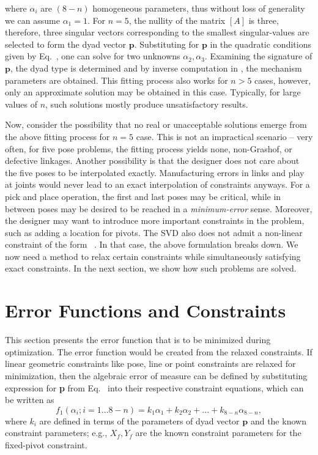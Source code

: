 where $\alpha_i$ are $(8-n)$ homogeneous parameters, thus without loss of generality we can assume $\alpha_{1} = 1$. For $n=5$, the nullity of the matrix $[A]$ is three, therefore, three singular vectors corresponding to the smallest singular-values are selected to form the dyad vector $\textbf{p}$. Substituting for $\textbf{p}$ in the quadratic conditions given by Eq.~, one can solve for two unknowns $\alpha_2, \alpha_3$. Examining the signature of $\textbf{p}$, the dyad type is determined and by inverse computation in , the mechanism parameters are obtained. This fitting process also works for $n>5$ cases, however, only an approximate solution may be obtained in this case. Typically, for large values of $n$, such solutions mostly produce unsatisfactory results.

Now, consider the possibility that no real or unacceptable solutions emerge from the above fitting process for $n=5$ case. This is not an impractical scenario -- very often, for five pose problems, the fitting process yields none, non-Grashof, or defective linkages. Another possibility is that the designer does not care about the five poses to be interpolated exactly. Manufacturing errors in links and play at joints would never lead to an exact interpolation of constraints anyways. For a pick and place operation, the first and last poses may be critical, while in between poses may be desired to be reached in a \emph{minimum-error} sense. Moreover, the designer may want to introduce more important constraints in the problem, such as adding a location for pivots. The SVD also does not admit a non-linear constraint of the form ~. In that case, the above formulation breaks down. We now need a method to relax certain constraints while simultaneously satisfying exact constraints. In the next section, we show how such problems are solved.

\section{Error Functions and Constraints}\label{optimality}
This section presents the error function that is to be minimized during optimization. The error function would be created from the relaxed constraints. If linear geometric constraints like pose, line or point constraints are relaxed for minimization, then the algebraic error of measure can be defined by substituting expression for {\bf p} from Eq.~ into their respective constraint equations, which can be written as
\begin{equation}\label{poseError}
f_1(\alpha_i;i=1 \ldots 8-n) = k_1\alpha_1+k_2\alpha_2 +...+k_{8-n}\alpha_{8-n},
\end{equation}
where $k_i$ are defined in terms of the parameters of dyad vector $\textbf{p}$ and the known constraint parameters; e.g., $X_f, Y_f$ are the known constraint parameters for the fixed-pivot constraint.

